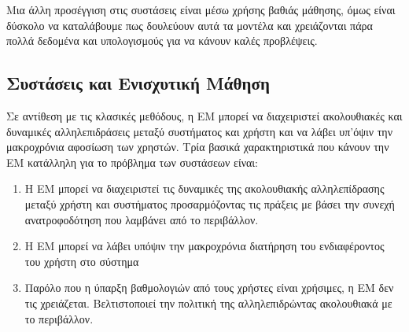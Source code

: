 Μια άλλη προσέγγιση στις συστάσεις είναι μέσω χρήσης βαθιάς μάθησης, όμως είναι δύσκολο να καταλάβουμε πως δουλεύουν αυτά τα μοντέλα και χρειάζονται πάρα πολλά δεδομένα και υπολογισμούς για να κάνουν καλές προβλέψεις.

\subsection{Συστάσεις και Ενισχυτική Μάθηση}

Σε αντίθεση με τις κλασικές μεθόδους, η ΕΜ μπορεί να διαχειριστεί ακολουθιακές και δυναμικές αλληλεπιδράσεις μεταξύ συστήματος και χρήστη και να λάβει υπ'όψιν την μακροχρόνια αφοσίωση των χρηστών. Τρία βασικά χαρακτηριστικά που κάνουν την ΕΜ κατάλληλη για το πρόβλημα των συστάσεων είναι:
\begin{enumerate}
    \item Η ΕΜ μπορεί να διαχειριστεί τις δυναμικές της ακολουθιακής αλληλεπίδρασης μεταξύ χρήστη και συστήματος προσαρμόζοντας τις πράξεις με βάσει την συνεχή ανατροφοδότηση που λαμβάνει από το περιβάλλον.
    \item Η ΕΜ μπορεί να λάβει υπόψιν την μακροχρόνια διατήρηση του ενδιαφέροντος του χρήστη στο σύστημα
    \item Παρόλο που η ύπαρξη βαθμολογιών από τους χρήστες είναι χρήσιμες, η ΕΜ δεν τις χρειάζεται. Βελτιστοποιεί την πολιτική της αλληλεπιδρώντας ακολουθιακά με το περιβάλλον.
\end{enumerate}

